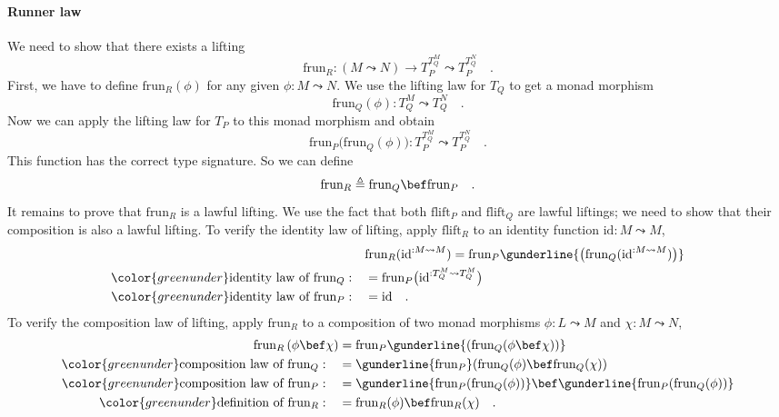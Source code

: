 \paragraph{Runner law}

We need to show that there exists a lifting 
\[
\text{frun}_{R}:\left(M\leadsto N\right)\rightarrow T_{P}^{T_{Q}^{M}}\leadsto T_{P}^{T_{Q}^{N}}\quad.
\]
First, we have to define $\text{frun}_{R}(\phi)$ for any given $\phi:M\leadsto N$.
We use the lifting law for $T_{Q}$ to get a monad morphism
\[
\text{frun}_{Q}(\phi):T_{Q}^{M}\leadsto T_{Q}^{N}\quad.
\]
Now we can apply the lifting law for $T_{P}$ to this monad morphism
and obtain
\[
\text{frun}_{P}\big(\text{frun}_{Q}(\phi)\big):T_{P}^{T_{Q}^{M}}\leadsto T_{P}^{T_{Q}^{N}}\quad.
\]
This function has the correct type signature. So we can define
\[
\text{frun}_{R}\triangleq\text{frun}_{Q}\bef\text{frun}_{P}\quad.
\]
It remains to prove that $\text{frun}_{R}$ is a lawful lifting. We
use the fact that both $\text{flift}_{P}$ and $\text{flift}_{Q}$
are lawful liftings; we need to show that their composition is also
a lawful lifting. To verify the identity law of lifting, apply $\text{flift}_{R}$
to an identity function $\text{id}:M\leadsto M$,
\begin{align*}
 & \text{frun}_{R}(\text{id}^{:M\leadsto M})=\text{frun}_{P}\gunderline{\big(\text{frun}_{Q}(\text{id}^{:M\leadsto M})\big)}\\
{\color{greenunder}\text{identity law of }\text{frun}_{Q}:}\quad & =\text{frun}_{P}\big(\text{id}^{:T_{Q}^{M}\leadsto T_{Q}^{M}}\big)\\
{\color{greenunder}\text{identity law of }\text{frun}_{P}:}\quad & =\text{id}\quad.
\end{align*}
To verify the composition law of lifting, apply $\text{frun}_{R}$
to a composition of two monad morphisms $\phi:L\leadsto M$ and $\chi:M\leadsto N$,
\begin{align*}
\text{frun}_{R}\left(\phi\bef\chi\right) & =\text{frun}_{P}\gunderline{(\text{frun}_{Q}(\phi\bef\chi))}\\
{\color{greenunder}\text{composition law of }\text{frun}_{Q}:}\quad & =\gunderline{\text{frun}_{P}}(\text{frun}_{Q}(\phi)\bef\text{frun}_{Q}(\chi))\\
{\color{greenunder}\text{composition law of }\text{frun}_{P}:}\quad & =\gunderline{\text{frun}_{P}(\text{frun}_{Q}(\phi))}\bef\gunderline{\text{frun}_{P}(\text{frun}_{Q}(\phi))}\\
{\color{greenunder}\text{definition of }\text{frun}_{R}:}\quad & =\text{frun}_{R}(\phi)\bef\text{frun}_{R}(\chi)\quad.
\end{align*}


